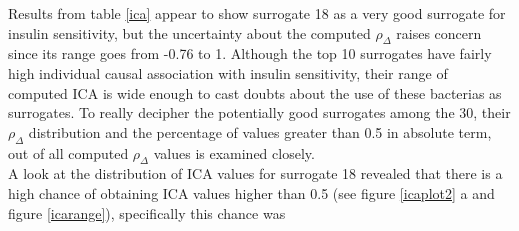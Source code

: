 \documentclass[a4paper,12pt]{article}
\begin{document}
	Results from table \ref{ica} appear to show surrogate 18 as a very good surrogate for insulin sensitivity, but the uncertainty about the computed $\rho_{\Delta}$ raises concern since its range goes from -0.76 to 1. Although the top 10 surrogates have fairly high individual causal association with insulin sensitivity, their range of computed ICA is wide enough to cast doubts about the use of these bacterias as surrogates. To really decipher the potentially good surrogates among the 30, their $\rho_{\Delta}$ distribution and the percentage of values greater than 0.5 in absolute term, out of all computed $\rho_{\Delta}$ values is examined closely. \\
	
	A look at the distribution of ICA values for surrogate 18 revealed that there is a high chance of obtaining ICA values higher than 0.5 (see figure \ref{icaplot2} a and figure \ref{icarange}), specifically this chance was  
	
\end{document}
